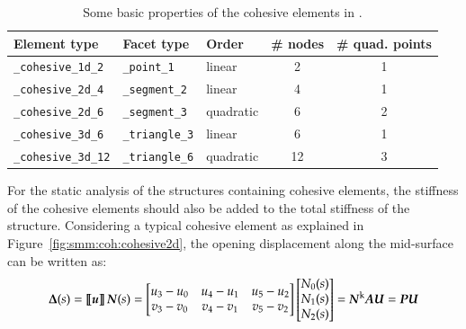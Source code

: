 \begin{table}[!htb]
\begin{center}
\begin{tabular}{l|llcc}
\toprule
Element type & Facet type & Order & \# nodes & \# quad. points  \\
\midrule
\texttt{\_cohesive\_1d\_2} & \texttt{\_point\_1} & linear & 2 & 1  \\
\hline
\texttt{\_cohesive\_2d\_4} & \texttt{\_segment\_2} & linear & 4 & 1  \\
\texttt{\_cohesive\_2d\_6} & \texttt{\_segment\_3} & quadratic & 6 & 2  \\
\hline
\texttt{\_cohesive\_3d\_6} & \texttt{\_triangle\_3} & linear & 6 & 1  \\
\texttt{\_cohesive\_3d\_12} & \texttt{\_triangle\_6} & quadratic & 12 & 3  \\
\bottomrule
\end{tabular}
\end{center}
\caption{Some basic properties of the cohesive elements in \akantu.}
\label{tab:cohesive_elements}
\end{table}

For the static analysis of the structures containing cohesive
elements, the stiffness of the cohesive elements should also be added
to the total stiffness of the structure. Considering a typical
cohesive element as explained in Figure~\ref{fig:smm:coh:cohesive2d},
the opening displacement along the mid-surface can be written as:
\begin{equation}
  \label{eq:opening}
  \boldsymbol{\Delta}(s) = \llbracket \boldsymbol{u}\rrbracket \,\boldsymbol{N}(s) =
  \begin{bmatrix}
    u_3-u_0 & u_4-u_1 & u_5-u_2\\
    v_3-v_0 & v_4-v_1 & v_5-v_2
  \end{bmatrix}
  \begin{bmatrix}
    N_0(s) \\ N_1(s) \\ N_2(s)
  \end{bmatrix} =
  \boldsymbol{N}^\mathrm{k} \boldsymbol{A U} = \boldsymbol{PU}
\end{equation}

